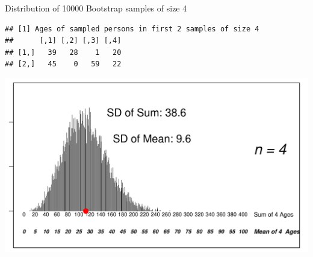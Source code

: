 \documentclass[10pt,handout]{beamer}\usepackage[]{graphicx}\usepackage[]{color}
\makeatletter
\def\maxwidth{ %
  \ifdim\Gin@nat@width>\linewidth
    \linewidth
  \else
    \Gin@nat@width
  \fi
}
\newenvironment{kframe}{%
 \def\at@end@of@kframe{}%
 \ifinner\ifhmode%
  \def\at@end@of@kframe{\end{minipage}}%
  \begin{minipage}{\columnwidth}%
 \fi\fi%
 \def\FrameCommand##1{\hskip\@totalleftmargin \hskip-\fboxsep
 \colorbox{shadecolor}{##1}\hskip-\fboxsep
     \hskip-\linewidth \hskip-\@totalleftmargin \hskip\columnwidth}%
 \MakeFramed {\advance\hsize-\width
   \@totalleftmargin\z@ \linewidth\hsize
   \@setminipage}}%
 {\par\unskip\endMakeFramed%
 \at@end@of@kframe}
\newenvironment{knitrout}{}{} %
\makeatother
\begin{document}
\begin{frame}[fragile]{Distribution of 10000 Bootstrap samples of size 4}
\begin{knitrout}\tiny
{}\color{fgcolor}\begin{kframe}
\begin{verbatim}
## [1] Ages of sampled persons in first 2 samples of size 4
##      [,1] [,2] [,3] [,4]
## [1,]   39   28    1   20
## [2,]   45    0   59   22
\end{verbatim}
\end{kframe}

{\centering \includegraphics[width=\maxwidth]{figure/unnamed-chunk-3-1} 

}



\end{knitrout}
	
\end{frame}
\end{document}
